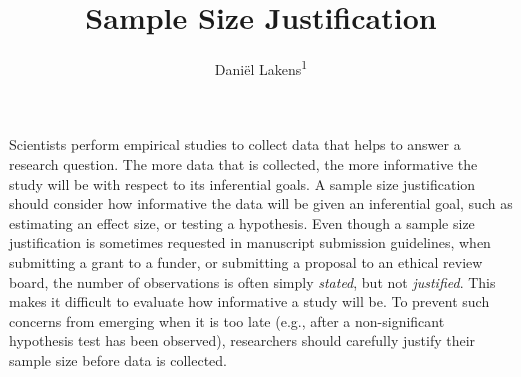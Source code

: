 \documentclass[
  english,
  ,jou, a4paper,floatsintext]{apa6}
\title{Sample Size Justification}
\author{Daniël Lakens\textsuperscript{1}}
\date{}
\affiliation{\vspace{0.5cm}\textsuperscript{1} Eindhoven University of Technology}
\begin{document}
\maketitle

Scientists perform empirical studies to collect data that helps to answer a research question. The more data that is collected, the more informative the study will be with respect to its inferential goals. A sample size justification should consider how informative the data will be given an inferential goal, such as estimating an effect size, or testing a hypothesis. Even though a sample size justification is sometimes requested in manuscript submission guidelines, when submitting a grant to a funder, or submitting a proposal to an ethical review board, the number of observations is often simply \emph{stated}, but not \emph{justified}. This makes it difficult to evaluate how informative a study will be. To prevent such concerns from emerging when it is too late (e.g., after a non-significant hypothesis test has been observed), researchers should carefully justify their sample size before data is collected.
\end{document}
